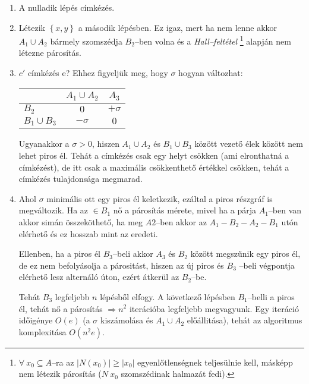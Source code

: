 \begin{enumerate}
  \item A nulladik lépés címkézés.
  \item Létezik $\left\{x,y\right\}$ a második lépésben. Ez igaz, mert ha nem
  lenne akkor $A_1 \cup A_2$ bármely szomszédja $B_2$--ben volna és a
  \emph{Hall--feltétel} \footnote{$ \forall~x_0 \subseteq A$--ra az $|N(x_0)|
  \geq |x_0|$ egyenlőtlenségnek teljesülnie kell, másképp nem létezik párosítás
  ($N~x_0$ szomszédinak halmazát fedi).} alapján nem létezne párosítás.
  \item $c'$ címkézés e? Ehhez figyeljük meg, hogy $\sigma$ hogyan változhat:
  
  \begin{tabular}{ l |  c c }
                  & $A_1 \cup A_2$ & $A_3$ \\
                  \hline
  $B_2$           & $0$            & $+\sigma$ \\
  $B_1 \cup B_3$ & $-\sigma$      & $0$ \\
  \end{tabular}
  
  Ugyanakkor a $\sigma > 0 $, hiszen $A_1 \cup A_2$ és $B_1 \cup B_3$ között
  vezető élek között nem lehet piros él. Tehát a címkézés csak egy helyt csökken
  (ami elronthatná a címkézést), de itt csak a maximális csökkenthető értékkel
  csökken, tehát a címkézés tulajdonsága megmarad.
 
  \item Ahol $\sigma$ minimális ott egy piros él keletkezik, ezáltal a piros
  részgráf is megváltozik. Ha az $\in B_1$ nő a párosítás mérete, mivel ha a
  párja $A_1$--ben van akkor simán összeköthető, ha meg $A2$--ben akkor az
  $A_1-B_2-A_2-B_1$ utón elérhető és ez hosszab mint az eredeti. 
  
  Ellenben, ha a piros él $B_3$--beli akkor $A_3$ és $B_2$ között megszűnik egy
  piros él, de ez nem befolyásolja a párositást, hiszen az új piros és $B_3$
  --beli végpontja elérhető lesz alternáló úton, ezért átkerül az $B_2$--be.
  
  Tehát $B_3$ legfeljebb $n$ lépésből elfogy. A  következő lépésben $B_1$--belli
  a piros él, tehát nő a párosítás $\Rightarrow n^2$ iterációba legfeljebb
  megvagyunk. Egy iteráció időigénye $O(e)$ (a $\sigma$ kiszámolása és $A_1 \cup
  A_2$ előállitása), tehát az algoritmus komplexitása $O(n^2e)$.
  \end{enumerate}
